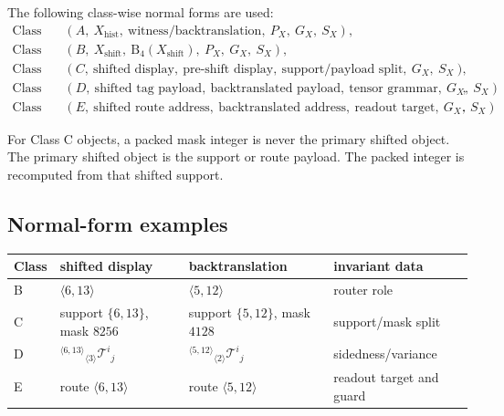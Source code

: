 \begin{definition}
\label{def:v400-r05-class-wise-shifted-normal-forms}
The following class-wise normal forms are used:
\[
\begin{array}{ll}
\text{Class A:} & (A,\ X_{\mathrm{hist}},\ \mathrm{witness/backtranslation},\ P_X,\ G_X,\ S_X),\\[0.2em]
\text{Class B:} & (B,\ X_{\mathrm{shift}},\ \mathrm B_4(X_{\mathrm{shift}}),\ P_X,\ G_X,\ S_X),\\[0.2em]
\text{Class C:} & (C,\ \text{shifted display},\ \text{pre-shift display},\ \text{support/payload split},\ G_X,\ S_X),\\[0.2em]
\text{Class D:} & (D,\ \text{shifted tag payload},\ \text{backtranslated payload},\ \text{tensor grammar},\ G_X,\ S_X),\\[0.2em]
\text{Class E:} & (E,\ \text{shifted route address},\ \text{backtranslated address},\ \text{readout target},\ G_X,\ S_X).
\end{array}
\]
\end{definition}

\begin{remark}
\label{rem:v400-r05-class-c-special-rule}
For Class C objects, a packed mask integer is never the primary shifted object.
The primary shifted object is the support or route payload. The packed integer
is recomputed from that shifted support.
\end{remark}

\subsection{Normal-form examples}
\label{subsec:v400-r05-normal-form-examples}

\begin{center}
\scriptsize
\setlength{\tabcolsep}{2pt}
\begin{tabular}{@{}p{}P{0.24\textwidth}P{0.25\textwidth}P{0.25\textwidth}@{}}
\toprule
Class & shifted display & backtranslation & invariant data\\
\midrule
B & $\langle 6,13\rangle$ & $\langle 5,12\rangle$ & router role\\
C & support $\{6,13\}$, mask $8256$ & support $\{5,12\}$, mask $4128$ & support/mask split\\
D & ${}^{\langle 6,13\rangle}{}_{\langle 3\rangle}\mathcal T^{i}{}_{j}$ & ${}^{\langle 5,12\rangle}{}_{\langle 2\rangle}\mathcal T^{i}{}_{j}$ & sidedness/variance\\
E & route $\langle 6,13\rangle$ & route $\langle 5,12\rangle$ & readout target and guard\\
\bottomrule
\end{tabular}
\end{center}

